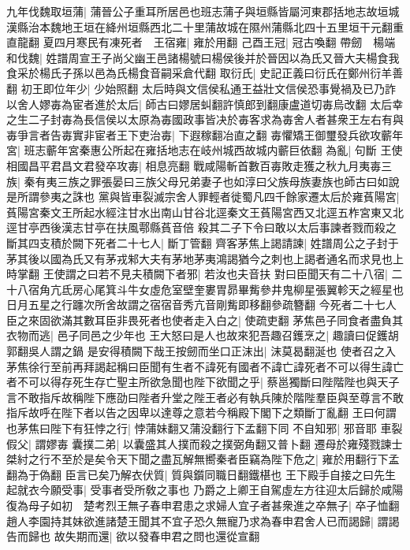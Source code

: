 九年伐魏取垣蒲|{
	蒲晉公子重耳所居邑也班志蒲子與垣縣皆屬河東郡括地志故垣城漢縣治本魏地王垣在絳州垣縣西北二十里蒲故城在隰州蒲縣北四十五里垣干元翻重直龍翻}
夏四月寒民有凍死者　王宿雍|{
	雍於用翻}
己酉王冠|{
	冠古喚翻}
帶劒　楊端和伐魏|{
	姓譜周宣王子尚父幽王邑諸楊號曰楊侯後并於晉因以為氏又晉大夫楊食我食采於楊氏子孫以邑為氏楊食音嗣采倉代翻}
取衍氏|{
	史記正義曰衍氏在鄭州衍羊善翻}
初王即位年少|{
	少始照翻}
太后時與文信侯私通王益壯文信侯恐事覺禍及已乃詐以舍人嫪毐為宦者進於太后|{
	師古曰嫪居虯翻許慎郎到翻康盧道切毐烏改翻}
太后幸之生二子封毐為長信侯以太原為毐國政事皆决於毐客求為毐舍人者甚衆王左右有與毐爭言者告毐實非宦者王下吏治毐|{
	下遐稼翻冶直之翻}
毐懼矯王御璽發兵欲攻蘄年宮|{
	班志蘄年宮秦惠公所起在雍括地志在岐州城西故城内蘄巨依翻}
為亂|{
	句斷}
王使相國昌平君昌文君發卒攻毐|{
	相息亮翻}
戰咸陽斬首數百毐敗走獲之秋九月夷毐三族|{
	秦有夷三族之罪張晏曰三族父母兄弟妻子也如淳曰父族母族妻族也師古曰如說是所謂參夷之誅也}
黨與皆車裂滅宗舍人罪輕者徙蜀凡四千餘家遷太后於雍萯陽宮|{
	萯陽宮秦文王所起水經注甘水出南山甘谷北逕秦文王萯陽宮西又北逕五柞宮東又北逕甘亭西後漢志甘亭在扶風鄠縣萯音倍}
殺其二子下令曰敢以太后事諫者戮而殺之斷其四支積於闕下死者二十七人|{
	斷丁管翻}
齊客茅焦上謁請諫|{
	姓譜周公之子封于茅其後以國為氏又有茅戎邾大夫有茅地茅夷鴻謁猶今之刺也上謁者通名而求見也上時掌翻}
王使謂之曰若不見夫積闕下者邪|{
	若汝也夫音扶}
對曰臣聞天有二十八宿|{
	二十八宿角亢氐房心尾箕斗牛女虛危室壁奎婁胃昴畢觜參井鬼柳星張翼軫天之經星也日月五星之行躔次所舍故謂之宿宿音秀亢音剛觜即移翻參疏簪翻}
今死者二十七人臣之來固欲滿其數耳臣非畏死者也使者走入白之|{
	使疏吏翻}
茅焦邑子同食者盡負其衣物而逃|{
	邑子同邑之少年也}
王大怒曰是人也故來犯吾趣召鑊烹之|{
	趣讀曰促鑊胡郭翻吳人謂之鍋}
是安得積闕下哉王按劒而坐口正沫出|{
	沫莫曷翻涎也}
使者召之入茅焦徐行至前再拜謁起稱曰臣聞有生者不諱死有國者不諱亡諱死者不可以得生諱亡者不可以得存死生存亡聖主所欲急聞也陛下欲聞之乎|{
	蔡邕獨斷曰陛階陛也與天子言不敢指斥故稱陛下應劭曰陛者升堂之陛王者必有執兵陳於階陛羣臣與至尊言不敢指斥故呼在陛下者以告之因卑以達尊之意若今稱殿下閣下之類斷丁亂翻}
王曰何謂也茅焦曰陛下有狂悖之行|{
	悖蒲妹翻又蒲没翻行下孟翻下同}
不自知邪|{
	邪音耶}
車裂假父|{
	謂嫪毐}
囊撲二弟|{
	以囊盛其人撲而殺之撲弼角翻又普卜翻}
遷母於雍殘戮諫士桀紂之行不至於是矣令天下聞之盡瓦解無嚮秦者臣竊為陛下危之|{
	雍於用翻行下孟翻為于偽翻}
臣言已矣乃解衣伏質|{
	質與鑕同職日翻鐵椹也}
王下殿手自接之曰先生起就衣今願受事|{
	受事者受所敎之事也}
乃爵之上卿王自駕虛左方往迎太后歸於咸陽復為母子如初　楚考烈王無子春申君患之求婦人宜子者甚衆進之卒無子|{
	卒子恤翻}
趙人李園持其妹欲進諸楚王聞其不宜子恐久無寵乃求為春申君舍人已而謁歸|{
	謂謁告而歸也}
故失期而還|{
	欲以發春申君之問也還從宣翻}
